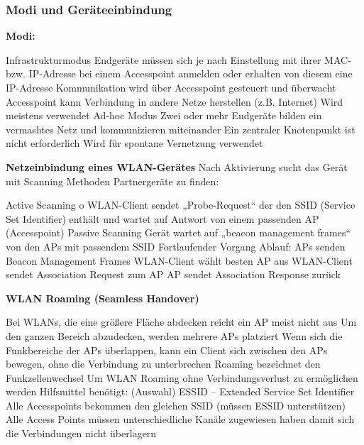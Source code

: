 \documentclass[10pt]{article}
\begin{document}
\begin{flushleft}
\subsubsection{Modi und Geräteeinbindung}

\textbf{Modi:}
\begin{outline}
    \1 Infrastrukturmodus
        \2 Endgeräte müssen sich je nach Einstellung mit ihrer MAC- bzw. IP-Adresse bei einem Accesspoint anmelden oder erhalten von diesem eine IP-Adresse
        \2 Kommunikation wird über Accesspoint gesteuert und überwacht
        \2 Accesspoint kann Verbindung in andere Netze herstellen (z.B. Internet)
        \2 Wird meistens verwendet
    \1 Ad-hoc Modus
        \2 Zwei oder mehr Endgeräte bilden ein vermashtes Netz und kommunizieren miteinander
        \2 Ein zentraler Knotenpunkt ist nicht erforderlich
        \2 Wird für spontane Vernetzung verwendet 
\end{outline}


\textbf{Netzeinbindung eines WLAN-Gerätes}
Nach Aktivierung sucht das Gerät mit Scanning Methoden Partnergeräte zu finden:
\begin{outline}
    \1 Active Scanning
        o	WLAN-Client sendet „Probe-Request“ der den SSID (Service Set Identifier) enthält und wartet auf Antwort von einem passenden AP (Accesspoint)
    \1 Passive Scanning
        \2 Gerät wartet auf „beacon management frames“ von den APs mit passendem SSID
        \2 Fortlaufender Vorgang
        \2 Ablauf:
                \3 APs senden Beacon Management Frames
                \3 WLAN-Client wählt besten AP aus
                \3 WLAN-Client sendet Association Request zum AP
                \3 AP sendet Association Response zurück
\end{outline}

\textbf{WLAN Roaming (Seamless Handover)}

\begin{outline}
    \1 Bei WLANs, die eine größere Fläche abdecken reicht ein AP meist nicht aus
    \1 Um den ganzen Bereich abzudecken, werden mehrere APs platziert
    \1 Wenn sich die Funkbereiche der APs überlappen, kann ein Client sich zwischen den APs bewegen, ohne die Verbindung zu unterbrechen
    \1 Roaming bezeichnet den Funkzellenwechsel
    \1 Um WLAN Roaming ohne Verbindungsverlust zu ermöglichen werden Hilfsmittel benötigt: (Auswahl)
        \2 ESSID – Extended Service Set Identifier
            \3 \textrightarrow\space Alle Accesspoints bekommen den gleichen SSID (müssen ESSID unterstützen)
            \3 Alle Access Points müssen unterschiedliche Kanäle zugewiesen haben damit sich die Verbindungen nicht überlagern
\end{outline}



\end{flushleft}
\end{document}
